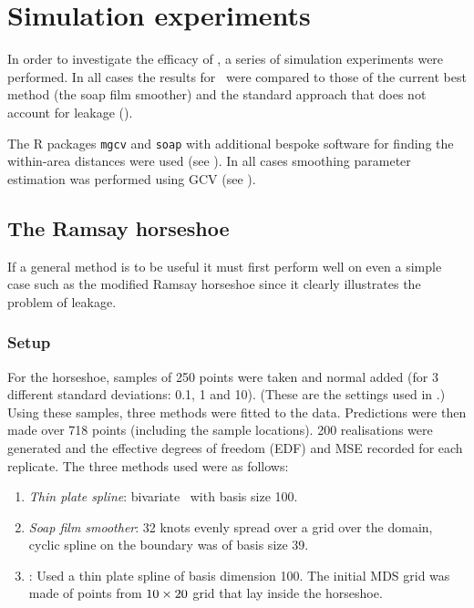 \section{Simulation experiments}
\label{mdssims}

In order to investigate the efficacy of \mdsap, a series of simulation experiments were performed. In all cases the results for \mdsap\ were compared to those of the current best method (the soap film smoother) and the standard approach that does not account for leakage (\tprs).

The \textsf{R} packages \texttt{mgcv} and \texttt{soap} with additional bespoke software for finding the within-area distances were used (see ). In all cases smoothing parameter estimation was performed using GCV (see ).

\subsection{The Ramsay horseshoe}

If a general method is to be useful it must first perform well on even a simple case such as the modified Ramsay horseshoe since it clearly illustrates the problem of leakage.

\subsubsection{Setup}

For the horseshoe, samples of 250 points were taken and normal added (for 3 different standard deviations: 0.1, 1 and 10). (These are the settings used in \cite{soap}.) Using these samples, three methods were fitted to the data. Predictions were then made over 718 points (including the sample locations). 200 realisations were generated and the effective degrees of freedom (EDF) and MSE recorded for each replicate. The three methods used were as follows:

\begin{enumerate}
\item \emph{Thin plate spline}: bivariate \tprs\  with basis size 100.
\item \emph{Soap film smoother}: 32 knots evenly spread over a grid over the domain, cyclic spline on the boundary was of basis size 39.
\item \emph{\mdsap}: Used a thin plate spline of basis dimension 100. The initial MDS grid was made of points from $10\times 20$ grid that lay inside the horseshoe.
\end{enumerate} 

